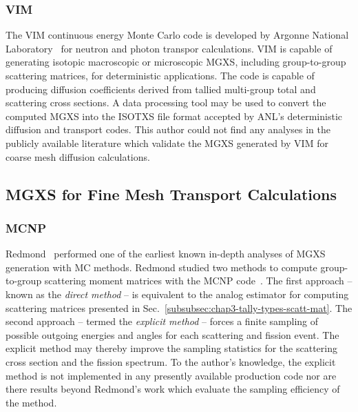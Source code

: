 \subsubsection{VIM}
\label{subsec:chap3-lit-review-diffusion-vim}

The VIM continuous energy Monte Carlo code is developed by Argonne National Laboratory~\cite{blomquist2002status} for neutron and photon transpor calculations. VIM is capable of generating isotopic macroscopic or microscopic \ac{MGXS}, including group-to-group scattering matrices, for deterministic applications. The code is capable of producing diffusion coefficients derived from tallied multi-group total and scattering cross sections. A data processing tool may be used to convert the computed \ac{MGXS} into the ISOTXS file format accepted by ANL's deterministic diffusion and transport codes. This author could not find any analyses in the publicly available literature which validate the \ac{MGXS} generated by VIM for coarse mesh diffusion calculations.

\subsection{MGXS for Fine Mesh Transport Calculations}
\label{subsec:chap3-lit-review-transport}

\subsubsection{MCNP}
\label{subsec:chap3-lit-review-transport-mcnp}

Redmond~\cite{redmond1997multigroup} performed one of the earliest known in-depth analyses of \ac{MGXS} generation with \ac{MC} methods. Redmond studied two methods to compute group-to-group scattering moment matrices with the MCNP code~\cite{mcnpx2003manual}. The first approach -- known as the \textit{direct method} -- is equivalent to the analog estimator for computing scattering matrices presented in Sec.~\ref{subsubsec:chap3-tally-types-scatt-mat}. The second approach -- termed the \textit{explicit method} -- forces a finite sampling of possible outgoing energies and angles for each scattering and fission event. The explicit method may thereby improve the sampling statistics for the scattering cross section and the fission spectrum. To the author's knowledge, the explicit method is not implemented in any presently available production code nor are there results beyond Redmond's work which evaluate the sampling efficiency of the method.

